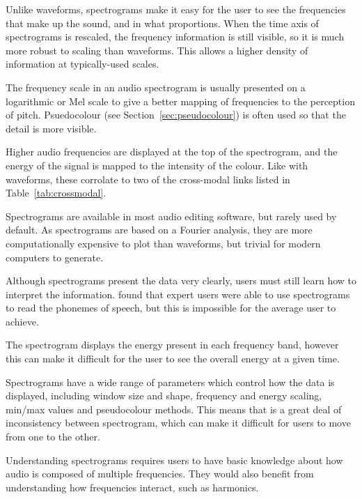 Unlike waveforms, spectrograms make it easy for the user to see the frequencies that make up the sound, and in what
proportions. When the time axis of spectrograms is rescaled, the frequency information is still visible, so it is much
more robust to scaling than waveforms. This allows a higher density of information at typically-used scales.

The frequency scale in an audio spectrogram is usually presented on a logarithmic or Mel scale to give a better mapping
of frequencies to the perception of pitch. Psuedocolour (see Section~\ref{sec:pseudocolour}) is often used so that the
detail is more visible.

Higher audio frequencies are displayed at the top of the spectrogram, and the energy of the signal is mapped to the
intensity of the colour. Like with waveforms, these corrolate to two of the cross-modal links listed in
Table~\ref{tab:crossmodal}.

Spectrograms are available in most audio editing software, but rarely used by default. As spectrograms are based on a
Fourier analysis, they are more computationally expensive to plot than waveforms, but trivial for modern computers to
generate.

Although spectrograms present the data very clearly, users must still learn how to interpret the information.  
\citet{Zue1986} found that expert users were able to use spectrograms to read the phonemes of speech, but this is
impossible for the average user to achieve.

The spectrogram displays the energy present in each frequency band, however this can make it difficult for the user to
see the overall energy at a given time.

Spectrograms have a wide range of parameters which control how the data is displayed, including window size and 
shape, frequency and energy scaling, min/max values and pseudocolour methods. This means that is a great deal of
inconsistency between spectrogram, which can make it difficult for users to move from one to the other.

Understanding spectrograms requires users to have basic knowledge about how audio is composed of multiple frequencies.
They would also benefit from understanding how frequencies interact, such as harmonics.



